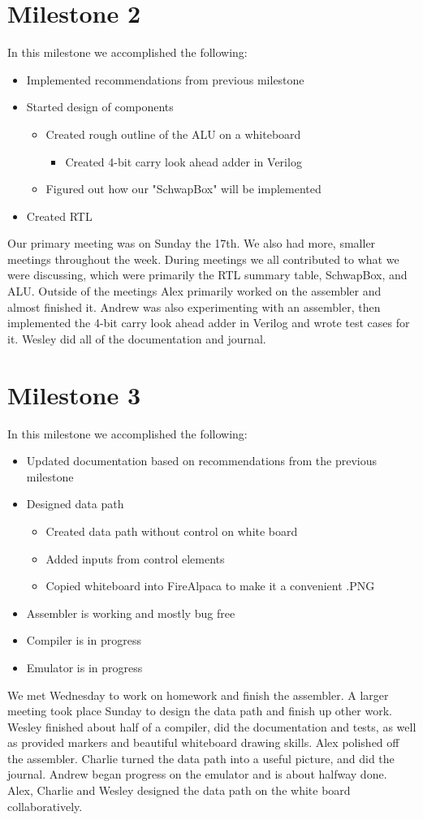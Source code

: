 \documentclass{report}
\begin{document}
	\section{Milestone 2}
		In this milestone we accomplished the following:
		\begin{itemize}
			\item Implemented recommendations from previous milestone
			\item Started design of components
			\begin{itemize}
				\item Created rough outline of the ALU on a whiteboard
				\begin{itemize}
					\item Created 4-bit carry look ahead adder in Verilog
				\end{itemize}
				\item Figured out how our "SchwapBox" will be implemented
			\end{itemize}
			\item Created RTL
		\end{itemize}
		Our primary meeting was on Sunday the 17th.  We also had more, smaller meetings throughout the week.  During meetings we all contributed to what we were discussing, which were primarily the RTL summary table, SchwapBox, and ALU.  Outside of the meetings Alex primarily worked on the assembler and almost finished it.  Andrew was also experimenting with an assembler, then implemented the 4-bit carry look ahead adder in Verilog and wrote test cases for it.  Wesley did all of the documentation and journal.
	\section{Milestone 3}
		In this milestone we accomplished the following:
		\begin{itemize}
			\item Updated documentation based on recommendations from the previous milestone
			\item Designed data path
			\begin{itemize}
				\item Created data path without control on white board
				\item Added inputs from control elements
				\item Copied whiteboard into FireAlpaca to make it a convenient .PNG
			\end{itemize}
			\item Assembler is working and mostly bug free
			\item Compiler is in progress
			\item Emulator is in progress
		\end{itemize}
		We met Wednesday to work on homework and finish the assembler. A larger meeting took place Sunday to design the data path and finish up other work. Wesley finished about half of a compiler, did the documentation and tests, as well as provided markers and beautiful whiteboard drawing skills. Alex polished off the assembler. Charlie turned the data path into a useful picture, and did the journal. Andrew began progress on the emulator and is about halfway done. Alex, Charlie and Wesley designed the data path on the white board collaboratively.
\end{document}
